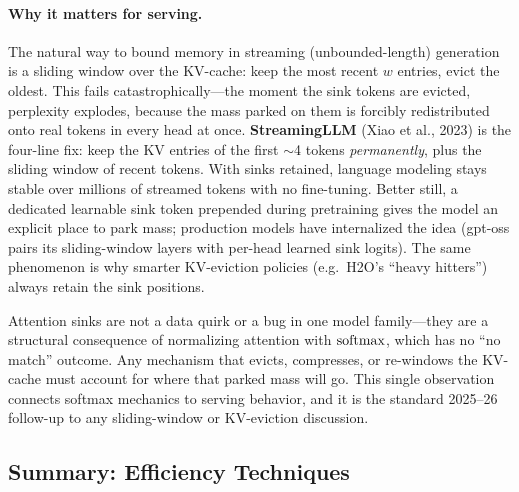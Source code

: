 \paragraph{Why it matters for serving.}
The natural way to bound memory in streaming (unbounded-length) generation
is a sliding window over the KV-cache: keep the most recent $w$ entries,
evict the oldest.  This fails catastrophically---the moment the sink
tokens are evicted, perplexity explodes, because the mass parked on them
is forcibly redistributed onto real tokens in every head at once.
\textbf{StreamingLLM} (Xiao et al., 2023) is the four-line fix: keep the
KV entries of the first $\sim$4 tokens \emph{permanently}, plus the
sliding window of recent tokens.  With sinks retained, language modeling
stays stable over millions of streamed tokens with no fine-tuning.  Better
still, a dedicated learnable sink token prepended during pretraining gives
the model an explicit place to park mass; production models have
internalized the idea (gpt-oss pairs its sliding-window layers with
per-head learned sink logits).  The same phenomenon is why smarter
KV-eviction policies (e.g.\ H2O's ``heavy hitters'') always retain the
sink positions.

\begin{keyinsight}
Attention sinks are not a data quirk or a bug in one model family---they
are a structural consequence of normalizing attention with $\operatorname{softmax}$,
which has no ``no match'' outcome.  Any mechanism that evicts, compresses,
or re-windows the KV-cache must account for where that parked mass will
go.  This single observation connects softmax mechanics to serving
behavior, and it is the standard 2025--26 follow-up to any sliding-window
or KV-eviction discussion.
\end{keyinsight}

\subsection{Summary: Efficiency Techniques}

